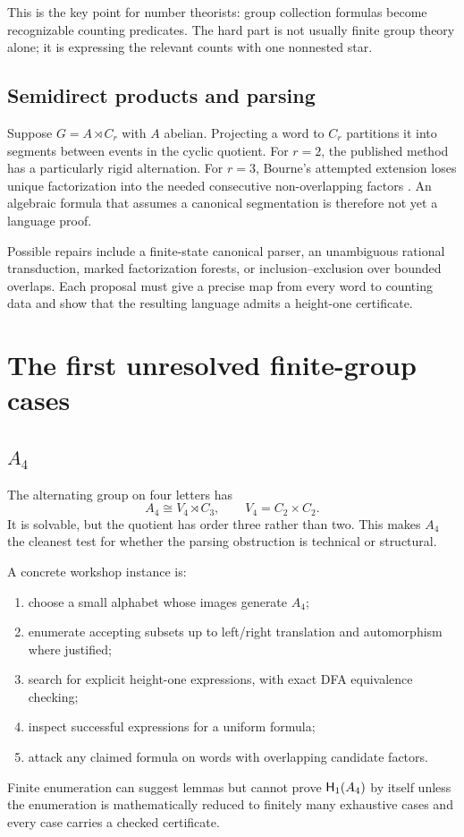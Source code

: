 \documentclass{amsart}
\begin{document}
This is the key point for number theorists: group collection formulas become recognizable counting predicates.  The hard part is not usually finite group theory alone; it is expressing the relevant counts with one nonnested star.

\subsection{Semidirect products and parsing}

Suppose $G=A\rtimes C_r$ with $A$ abelian.  Projecting a word to $C_r$ partitions it into segments between events in the cyclic quotient.  For $r=2$, the published method has a particularly rigid alternation.  For $r=3$, Bourne's attempted extension loses unique factorization into the needed consecutive non-overlapping factors \cite{bourne2017counting}.  An algebraic formula that assumes a canonical segmentation is therefore not yet a language proof.

Possible repairs include a finite-state canonical parser, an unambiguous rational transduction, marked factorization forests, or inclusion--exclusion over bounded overlaps.  Each proposal must give a precise map from every word to counting data and show that the resulting language admits a height-one certificate.

\section{The first unresolved finite-group cases}

\subsection{$A_4$}

The alternating group on four letters has
\[
  A_4\cong V_4\rtimes C_3,
  \qquad V_4=C_2\times C_2.
\]
It is solvable, but the quotient has order three rather than two.  This makes $A_4$ the cleanest test for whether the parsing obstruction is technical or structural.

A concrete workshop instance is:
\begin{enumerate}
  \item choose a small alphabet whose images generate $A_4$;
  \item enumerate accepting subsets up to left/right translation and automorphism where justified;
  \item search for explicit height-one expressions, with exact DFA equivalence checking;
  \item inspect successful expressions for a uniform formula;
  \item attack any claimed formula on words with overlapping candidate factors.
\end{enumerate}
Finite enumeration can suggest lemmas but cannot prove $\mathsf{H}_{1}(A_4)$ by itself unless the enumeration is mathematically reduced to finitely many exhaustive cases and every case carries a checked certificate.
\end{document}
